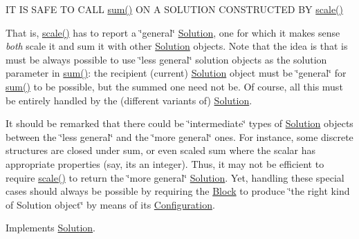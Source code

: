 IT IS S\+A\+FE TO C\+A\+LL \mbox{\hyperlink{class_s_m_spp__di__unipi__it_1_1_m_c_f_solution_ac91491316467fa9925f2c8e8fc08f4c1}{sum()}} ON A S\+O\+L\+U\+T\+I\+ON C\+O\+N\+S\+T\+R\+U\+C\+T\+ED BY \mbox{\hyperlink{class_s_m_spp__di__unipi__it_1_1_m_c_f_solution_a2c818cbb6d8b22f839a7f7336f6b382b}{scale()}}

That is, \mbox{\hyperlink{class_s_m_spp__di__unipi__it_1_1_m_c_f_solution_a2c818cbb6d8b22f839a7f7336f6b382b}{scale()}} has to report a \char`\"{}general\char`\"{} \mbox{\hyperlink{class_s_m_spp__di__unipi__it_1_1_solution}{Solution}}, one for which it makes sense {\itshape both} scale it and sum it with other \mbox{\hyperlink{class_s_m_spp__di__unipi__it_1_1_solution}{Solution}} objects. Note that the idea is that is must be always possible to use \char`\"{}less
general\char`\"{} solution objects as the solution parameter in \mbox{\hyperlink{class_s_m_spp__di__unipi__it_1_1_m_c_f_solution_ac91491316467fa9925f2c8e8fc08f4c1}{sum()}}\+: the recipient (current) \mbox{\hyperlink{class_s_m_spp__di__unipi__it_1_1_solution}{Solution}} object must be \char`\"{}general\char`\"{} for \mbox{\hyperlink{class_s_m_spp__di__unipi__it_1_1_m_c_f_solution_ac91491316467fa9925f2c8e8fc08f4c1}{sum()}} to be possible, but the summed one need not be. Of course, all this must be entirely handled by the (different variants of) \mbox{\hyperlink{class_s_m_spp__di__unipi__it_1_1_solution}{Solution}}.

It should be remarked that there could be \char`\"{}intermediate\char`\"{} types of \mbox{\hyperlink{class_s_m_spp__di__unipi__it_1_1_solution}{Solution}} objects between the \char`\"{}less general\char`\"{} and the \char`\"{}more general\char`\"{} ones. For instance, some discrete structures are closed under sum, or even scaled sum where the scalar has appropriate properties (say, it\textquotesingle{}s an integer). Thus, it may not be efficient to require \mbox{\hyperlink{class_s_m_spp__di__unipi__it_1_1_m_c_f_solution_a2c818cbb6d8b22f839a7f7336f6b382b}{scale()}} to return the \char`\"{}more general\char`\"{} \mbox{\hyperlink{class_s_m_spp__di__unipi__it_1_1_solution}{Solution}}. Yet, handling these special cases should always be possible by requiring the \mbox{\hyperlink{class_s_m_spp__di__unipi__it_1_1_block}{Block}} to produce \char`\"{}the right kind of Solution
object\char`\"{} by means of its \mbox{\hyperlink{class_s_m_spp__di__unipi__it_1_1_configuration}{Configuration}}. 

Implements \mbox{\hyperlink{class_s_m_spp__di__unipi__it_1_1_solution_adc2450947fd142657637bf79d91505a9}{Solution}}.

